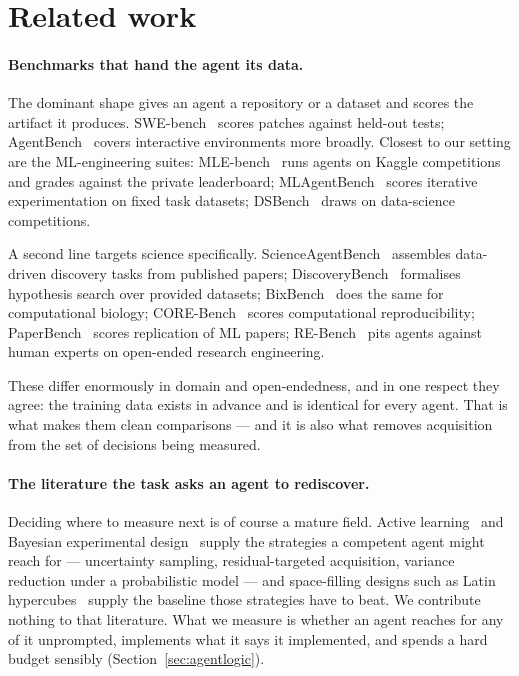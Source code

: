 \section{Related work}
\label{sec:related}

\paragraph{Benchmarks that hand the agent its data.}
The dominant shape gives an agent a repository or a dataset and scores the
artifact it produces. SWE-bench~\citep{jimenez2024swebench} scores patches
against held-out tests; AgentBench~\citep{liu2024agentbench} covers interactive
environments more broadly. Closest to our setting are the ML-engineering
suites: MLE-bench~\citep{chan2024mlebench} runs agents on Kaggle competitions
and grades against the private leaderboard;
MLAgentBench~\citep{huang2024mlagentbench} scores iterative experimentation on
fixed task datasets; DSBench~\citep{jing2024dsbench} draws on data-science
competitions.

A second line targets science specifically.
ScienceAgentBench~\citep{chen2025scienceagentbench} assembles data-driven
discovery tasks from published papers;
DiscoveryBench~\citep{majumder2025discoverybench} formalises hypothesis search
over provided datasets; BixBench~\citep{mitchener2025bixbench} does the same for
computational biology; CORE-Bench~\citep{siegel2024corebench} scores
computational reproducibility; PaperBench~\citep{starace2025paperbench} scores
replication of ML papers; RE-Bench~\citep{wijk2024rebench} pits agents against
human experts on open-ended research engineering.

These differ enormously in domain and open-endedness, and in one respect they
agree: the training data exists in advance and is identical for every agent.
That is what makes them clean comparisons --- and it is also what removes
acquisition from the set of decisions being measured.

\paragraph{The literature the task asks an agent to rediscover.}
Deciding where to measure next is of course a mature field. Active
learning~\citep{settles2009active} and Bayesian experimental
design~\citep{chaloner1995bayesian} supply the strategies a competent agent
might reach for --- uncertainty sampling, residual-targeted acquisition,
variance reduction under a probabilistic model --- and space-filling designs
such as Latin hypercubes~\citep{mckay1979lhs} supply the baseline those
strategies have to beat. We contribute nothing to that literature. What we
measure is whether an agent reaches for any of it unprompted, implements what it
says it implemented, and spends a hard budget sensibly
(Section~\ref{sec:agentlogic}).

